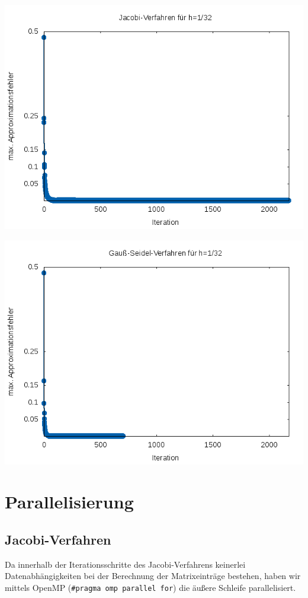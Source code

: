 \documentclass{article}
\begin{document}
\begin{center}
\includegraphics[scale=0.8]{bilder/fehler_jacobi_1_32.png}
\end{center}

\begin{center}
\includegraphics[scale=0.8]{bilder/fehler_gs_1_32.png}
\end{center}

\section{Parallelisierung}

\subsection{Jacobi-Verfahren} \label{parallel:jacobi}
Da innerhalb der Iterationsschritte des Jacobi-Verfahrens keinerlei Datenabhängigkeiten bei der Berechnung der Matrixeinträge bestehen, haben wir mittels OpenMP (\texttt{\#pragma omp parallel for}) die äußere Schleife parallelisiert.
\end{document}
